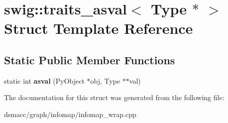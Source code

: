 \hypertarget{structswig_1_1traits__asval_3_01Type_01_5_01_4}{}\section{swig\+:\+:traits\+\_\+asval$<$ Type $\ast$ $>$ Struct Template Reference}
\label{structswig_1_1traits__asval_3_01Type_01_5_01_4}
\subsection*{Static Public Member Functions}
\begin{DoxyCompactItemize}
\item 
\mbox{\label{structswig_1_1traits__asval_3_01Type_01_5_01_4_a32b6c9822265d2822408db76cbae92c4}} 
static int {\bfseries asval} (Py\+Object $\ast$obj, Type $\ast$$\ast$val)
\end{DoxyCompactItemize}


The documentation for this struct was generated from the following file\+:\begin{DoxyCompactItemize}
\item 
dsmacc/graph/infomap/infomap\+\_\+wrap.\+cpp\end{DoxyCompactItemize}

